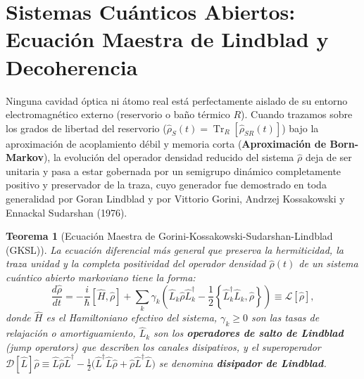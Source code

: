 \documentclass[11pt,a4paper,twoside]{report}
\theoremstyle{definition}
\theoremstyle{plain}
\newtheorem{teorema}{Teorema}[chapter]
\theoremstyle{remark}
\newcommand{\tr}{\operatorname{Tr}}
\newcommand{\comm}[2]{\left[ #1, #2 \right]}
\newcommand{\acomm}[2]{\left\{ #1, #2 \right\}}
\newcommand{\op}[1]{\hat{#1}}
\begin{document}
\section{Sistemas Cuánticos Abiertos: Ecuación Maestra de Lindblad y Decoherencia}

Ninguna cavidad óptica ni átomo real está perfectamente aislado de su entorno electromagnético externo (reservorio o baño térmico $R$). Cuando trazamos sobre los grados de libertad del reservorio ($\op{\rho}_S(t) = \tr_R[\op{\rho}_{SR}(t)]$) bajo la aproximación de acoplamiento débil y memoria corta (\textbf{Aproximación de Born-Markov}), la evolución del operador densidad reducido del sistema $\op{\rho}$ deja de ser unitaria y pasa a estar gobernada por un semigrupo dinámico completamente positivo y preservador de la traza, cuyo generador fue demostrado en toda generalidad por Goran Lindblad y por Vittorio Gorini, Andrzej Kossakowski y Ennackal Sudarshan (1976).

\begin{teorema}[Ecuación Maestra de Gorini-Kossakowski-Sudarshan-Lindblad (GKSL)]
La ecuación diferencial más general que preserva la hermiticidad, la traza unidad y la completa positividad del operador densidad $\op{\rho}(t)$ de un sistema cuántico abierto markoviano tiene la forma:
\begin{equation}
    \frac{d\op{\rho}}{dt} = -\frac{i}{\hbar}\comm{\op{H}}{\op{\rho}} + \sum_{k} \gamma_k \left( \op{L}_k \op{\rho} \op{L}_k^\dagger - \frac{1}{2}\acomm{\op{L}_k^\dagger \op{L}_k}{\op{\rho}} \right) \equiv \mathcal{L}[\op{\rho}],
\end{equation}
donde $\op{H}$ es el Hamiltoniano efectivo del sistema, $\gamma_k \ge 0$ son las tasas de relajación o amortiguamiento, $\op{L}_k$ son los \textbf{operadores de salto de Lindblad} (\textit{jump operators}) que describen los canales disipativos, y el superoperador $\mathcal{D}[\op{L}]\op{\rho} \equiv \op{L}\op{\rho}\op{L}^\dagger - \frac{1}{2}\big(\op{L}^\dagger\op{L}\op{\rho} + \op{\rho}\op{L}^\dagger\op{L}\big)$ se denomina \textbf{disipador de Lindblad}.
\end{teorema}
\end{document}
